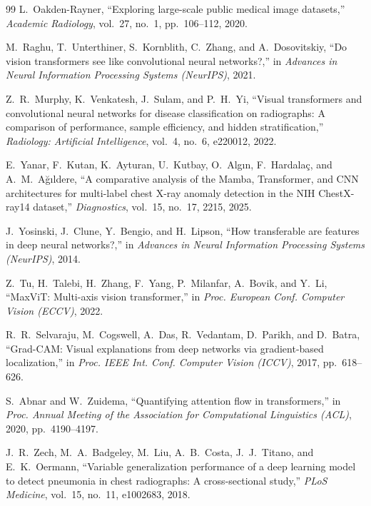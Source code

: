 \documentclass[conference]{IEEEtran}
\begin{document}
\begin{thebibliography}{99}
L.~Oakden-Rayner, ``Exploring large-scale public medical image datasets,'' \emph{Academic Radiology}, vol.~27, no.~1, pp.~106--112, 2020.

M.~Raghu, T.~Unterthiner, S.~Kornblith, C.~Zhang, and A.~Dosovitskiy, ``Do vision transformers see like convolutional neural networks?,'' in \emph{Advances in Neural Information Processing Systems (NeurIPS)}, 2021.

Z.~R.~Murphy, K.~Venkatesh, J.~Sulam, and P.~H.~Yi, ``Visual transformers and convolutional neural networks for disease classification on radiographs: A comparison of performance, sample efficiency, and hidden stratification,'' \emph{Radiology: Artificial Intelligence}, vol.~4, no.~6, e220012, 2022.

E.~Yanar, F.~Kutan, K.~Ayturan, U.~Kutbay, O.~Algın, F.~Hardalaç, and A.~M.~Ağıldere, ``A comparative analysis of the Mamba, Transformer, and CNN architectures for multi-label chest X-ray anomaly detection in the NIH ChestX-ray14 dataset,'' \emph{Diagnostics}, vol.~15, no.~17, 2215, 2025.

J.~Yosinski, J.~Clune, Y.~Bengio, and H.~Lipson, ``How transferable are features in deep neural networks?,'' in \emph{Advances in Neural Information Processing Systems (NeurIPS)}, 2014.

Z.~Tu, H.~Talebi, H.~Zhang, F.~Yang, P.~Milanfar, A.~Bovik, and Y.~Li, ``MaxViT: Multi-axis vision transformer,'' in \emph{Proc. European Conf. Computer Vision (ECCV)}, 2022.

R.~R.~Selvaraju, M.~Cogswell, A.~Das, R.~Vedantam, D.~Parikh, and D.~Batra, ``Grad-CAM: Visual explanations from deep networks via gradient-based localization,'' in \emph{Proc. IEEE Int. Conf. Computer Vision (ICCV)}, 2017, pp.~618--626.

S.~Abnar and W.~Zuidema, ``Quantifying attention flow in transformers,'' in \emph{Proc. Annual Meeting of the Association for Computational Linguistics (ACL)}, 2020, pp.~4190--4197.

J.~R.~Zech, M.~A.~Badgeley, M.~Liu, A.~B.~Costa, J.~J.~Titano, and E.~K.~Oermann, ``Variable generalization performance of a deep learning model to detect pneumonia in chest radiographs: A cross-sectional study,'' \emph{PLoS Medicine}, vol.~15, no.~11, e1002683, 2018.


\end{thebibliography}
\end{document}
